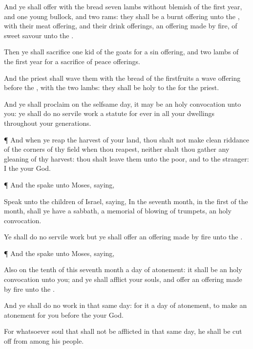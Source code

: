 {And ye shall
offer with the
bread
seven
lambs without
blemish of the
first
year, and
one
young
bullock, and
two
rams: they shall be
{} a burnt
offering unto the
{}, with their meat
offering, and their drink
offerings,
{} an offering made by
fire, of
sweet
savour unto the
{}.

Then ye shall
sacrifice
one
kid of the
goats for a sin
offering, and
two
lambs of the
first
year for a
sacrifice of peace
offerings.

And the
priest shall
wave them with the
bread of the
firstfruits
{} a wave
offering
before the
{}, with the
two
lambs: they shall be
holy to the
{} for the
priest.

And ye shall
proclaim on the
selfsame
day,
{} it may be an
holy
convocation unto you: ye shall
do no
servile
work
{} a
statute for
ever in all your
dwellings throughout your
generations.


\par }{\PP {}¶ And when ye
reap the
harvest of your
land, thou shalt not make clean
riddance of the
corners of thy
field when thou
reapest, neither shalt thou
gather any
gleaning of thy
harvest: thou shalt
leave them unto the
poor, and to the
stranger: I
{} the
{} your
God.


\par }{\PP {}¶ And the
{}
spake unto
Moses,
saying,

Speak unto the
children of
Israel,
saying, In the
seventh
month, in the
first
{} of the
month, shall ye have a
sabbath, a
memorial of
blowing of trumpets, an
holy
convocation.

Ye shall
do no
servile
work
{} but ye shall
offer an offering made by
fire unto the
{}.


\par }{\PP {}¶ And the
{}
spake unto
Moses,
saying,

Also on the
tenth
{} of this
seventh
month
{} a
day of
atonement: it shall be an
holy
convocation unto you; and ye shall
afflict your
souls, and
offer an offering made by
fire unto the
{}.

And ye shall
do no
work in that
same
day: for it
{} a
day of
atonement, to make an
atonement for you
before the
{} your
God.

For whatsoever
soul
{} that shall not be
afflicted in that
same
day, he shall be cut
off from among his
people.

}
